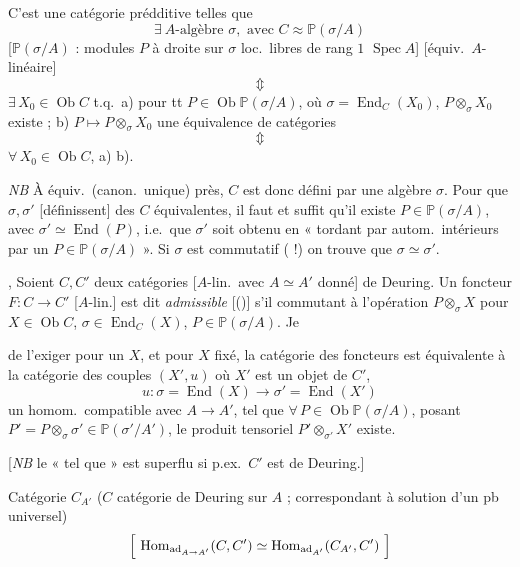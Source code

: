 \documentclass[11pt,a4paper]{article}
\begin{document}
C'est une catégorie prédditive  telles que
\[
  \exists\ A\text{-algèbre } \sigma, \text{ avec } C \approx
  \mathbb{P}(\sigma/A)
\]
[$\mathbb{P}(\sigma/A)$ : modules $P$ à droite sur $\sigma$ loc.\ libres de
rang $1$  $\operatorname{Spec} A$] [équiv.\ $A$-linéaire]
\[
  \Updownarrow
\]
$\exists\, X_{0} \in \operatorname{Ob} C$ t.q.\ a) pour tt
$P \in \operatorname{Ob} \mathbb{P}(\sigma/A)$, où $\sigma =
\operatorname{End}_{C}(X_{0})$, $P \otimes_{\sigma} X_{0}$ existe ;
b) $P \mapsto P \otimes_{\sigma} X_{0}$ une équivalence de catégories
\[
  \Updownarrow
\]
$\forall\, X_{0} \in \operatorname{Ob} C$, a) b).

\emph{NB} À équiv.\ (canon.\ unique) près, $C$ est donc défini par une
algèbre $\sigma$. Pour que $\sigma, \sigma'$  [définissent]
des $C$ équivalentes, il faut et suffit qu'il existe
$P \in \mathbb{P}(\sigma/A)$, avec $\sigma' \simeq \operatorname{End}(P)$,
i.e.\ que $\sigma'$ soit obtenu en « tordant par autom.\ intérieurs par un
$P \in \mathbb{P}(\sigma/A)$ ». Si $\sigma$ est commutatif (\ill{} \ill{}
\ill{} !) on trouve que $\sigma \simeq \sigma'$.

\struck{\ill{}}, Soient $C, C'$ deux catégories [$A$-lin.\ avec
$A \simeq A'$ donné] de Deuring. Un foncteur
$F : C \to C'$ \struck{\ill{}} [$A$-lin.] est dit \emph{admissible}
[()] s'il  commutant à
l'opération $P \otimes_{\sigma} X$ pour $X \in \operatorname{Ob} C$,
$\sigma \in \operatorname{End}_{C}(X)$, $P \in \mathbb{P}(\sigma/A)$. Je
 \ill{}

de l'exiger pour un $X$, et pour $X$ fixé, la 
catégorie des foncteurs est équivalente à la catégorie des couples
$(X', u)$ où $X'$ est un objet de $C'$,
\[
  u : \sigma = \operatorname{End}(X) \longrightarrow \sigma' =
  \operatorname{End}(X')
\]
un homom.\ compatible avec $A \to A'$, tel que
$\forall\, P \in \operatorname{Ob} \mathbb{P}(\sigma/A)$,
 posant $P' = P \otimes_{\sigma} \sigma' \in
\mathbb{P}(\sigma'/A')$, le produit tensoriel $P' \otimes_{\sigma'} X'$
existe.

[\emph{NB} le « tel que » est superflu si p.ex.\ $C'$ est de Deuring.]

Catégorie $C_{A'}$ ($C$ catégorie de Deuring sur $A$ ; correspondant à
solution d'un pb universel)
\[
  \Bigl[\ \operatorname{Hom}_{\mathrm{ad}_{A \to A'}}(C, C') \simeq
  \operatorname{Hom}_{\mathrm{ad}_{A'}}(C_{A'}, C')\ \Bigr]
\]
\end{document}
